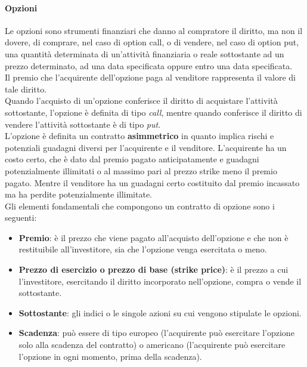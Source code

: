 \documentclass[12pt]{article}
\begin{document}
\paragraph{Opzioni}
Le opzioni sono strumenti finanziari che danno al compratore il diritto, ma non il dovere, di
comprare, nel caso di option call, o di vendere, nel caso di option put, una quantità
determinata di un’attività finanziaria o reale sottostante ad un prezzo determinato, ad una data
specificata oppure entro una data specificata.
\\
Il premio che l’acquirente dell’opzione paga al venditore rappresenta il valore di tale diritto.
\\
Quando l’acquisto di un’opzione conferisce il diritto di acquistare l’attività sottostante, l’opzione è definita di tipo \textit{call}, mentre quando conferisce il diritto di vendere l’attività sottostante è di tipo \textit{put}.
\\
L’opzione è definita un contratto \textbf{asimmetrico} in quanto implica rischi e potenziali guadagni diversi per l’acquirente e il venditore. L’acquirente ha un costo certo, che è dato dal premio pagato anticipatamente e guadagni potenzialmente illimitati o al massimo pari al prezzo strike meno il premio pagato. Mentre il venditore ha un guadagni certo costituito dal premio incassato ma ha perdite potenzialmente illimitate.
\\
Gli elementi fondamentali che compongono un contratto di opzione sono i seguenti:
\begin{itemize}
    \item \textbf{Premio}: è il prezzo che viene pagato all’acquisto dell’opzione e che non è restituibile all’investitore, sia che l’opzione venga esercitata o meno.
    \item \textbf{Prezzo di esercizio o prezzo di base (strike price)}: è il prezzo a cui l’investitore, esercitando il diritto incorporato nell’opzione, compra o vende il sottostante.
    \item \textbf{Sottostante}: gli indici o le singole azioni su cui vengono stipulate le opzioni.
    \item \textbf{Scadenza}: può essere di tipo europeo (l’acquirente può esercitare l’opzione solo alla scadenza del contratto) o americano (l’acquirente può esercitare l’opzione in ogni momento, prima della scadenza).
\end{itemize}
\newpage
\end{document}
